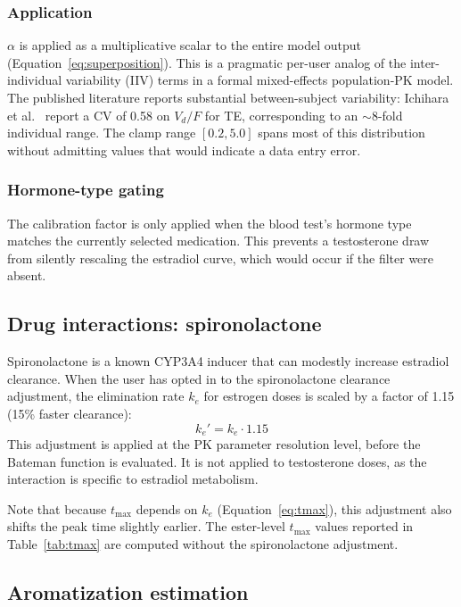 \documentclass[11pt,a4paper]{article}
\begin{document}
\subsubsection{Application}

$\alpha$ is applied as a multiplicative scalar to the entire model
output (Equation~\ref{eq:superposition}). This is a pragmatic per-user
analog of the inter-individual variability (IIV) terms in a formal
mixed-effects population-PK model. The published literature reports
substantial between-subject variability: Ichihara et al.~\cite{ichihara2020}
report a CV of 0.58 on $V_d/F$ for TE, corresponding to an $\sim$8-fold
individual range. The clamp range $[0.2, 5.0]$ spans most of this
distribution without admitting values that would indicate a data entry
error.

\subsubsection{Hormone-type gating}

The calibration factor is only applied when the blood test's hormone
type matches the currently selected medication. This prevents a
testosterone draw from silently rescaling the estradiol curve, which
would occur if the filter were absent.

\subsection{Drug interactions: spironolactone}
\label{sec:spiro}

Spironolactone is a known CYP3A4 inducer that can modestly increase
estradiol clearance. When the user has opted in to the spironolactone
clearance adjustment, the elimination rate $k_e$ for estrogen doses is
scaled by a factor of 1.15 (15\% faster clearance):
\begin{equation}
k_e' = k_e \cdot 1.15
\label{eq:spiro}
\end{equation}
This adjustment is applied at the PK parameter resolution level, before
the Bateman function is evaluated. It is not applied to testosterone
doses, as the interaction is specific to estradiol metabolism.

Note that because $t_{\max}$ depends on $k_e$
(Equation~\ref{eq:tmax}), this adjustment also shifts the peak time
slightly earlier. The ester-level $t_{\max}$ values reported in
Table~\ref{tab:tmax} are computed without the spironolactone adjustment.

\subsection{Aromatization estimation}
\label{sec:aromatization}
\end{document}
